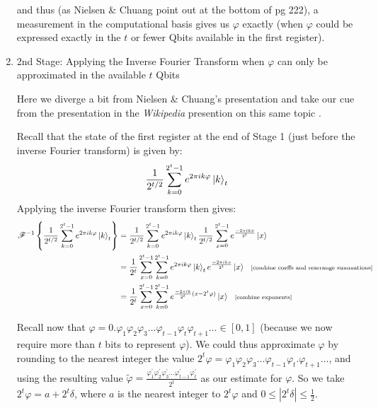 \documentclass{article}
\begin{document}
\begin{enumerate}[label=\textbf{(\arabic*)}]
and thus (as Nielsen \& Chuang point out at the bottom of pg 222), a measurement in the computational basis gives us $\varphi$ exactly (when $\varphi$ could be expressed exactly in the $t$ or fewer Qbits available in the first register).


\item 2nd Stage: Applying the Inverse Fourier Transform when $\varphi$ can only be approximated in the available $t$ Qbits

\vspace{0.1in}

Here we diverge a bit from Nielsen \& Chuang's presentation and take our cue from the presentation in the \textit{Wikipedia} presention on this same topic \cite{wikipedia:qpe}.

Recall that the state of the first register at the end of Stage 1 (just before the inverse Fourier transform) is given by:
\begin{align}
    \frac{1}{2^{t/2}}
      \sum_{k=0}^{2^t-1}
      e^{2\pi i k\varphi}\ket{k}_{t}
\end{align}
Applying the inverse Fourier transform then gives:
\begin{align}
    \mathscr{F}^{-1}\left\{\frac{1}{2^{t/2}}
      \sum_{k=0}^{2^t-1}
      e^{2\pi i k\varphi}\ket{k}_{t}\right\}
      &=
      \frac{1}{2^{t/2}}
      \sum_{k=0}^{2^t-1}
      e^{2\pi i k\varphi}\ket{k}_{t}
      \frac{1}{2^{t/2}}
      \sum_{x=0}^{2^t-1}
      e^{\frac{-2\pi i kx}{2^t}} \ket{x}\\
      &=
      \frac{1}{2^t}
      \sum_{x=0}^{2^t-1}
      \sum_{k=0}^{2^t-1}
      e^{2\pi i k\varphi}\ket{k}_{t}
      e^{\frac{-2\pi i kx}{2^t}} \ket{x} \hspace{0.1in}\text{\scriptsize [combine coeffs and rearrange summations]}\\
      &=
      \frac{1}{2^t}
      \sum_{x=0}^{2^t-1}
      \sum_{k=0}^{2^t-1}
      e^{\frac{-2\pi i k}{2^t}(x-2^{t}\varphi)} \ket{x} \hspace{0.1in}\text{\scriptsize [combine exponents]}
\end{align}

Recall now that $\varphi = 0.\varphi_{1}\varphi_{2}\varphi_{3}\ldots\varphi_{t-1}\varphi_{t}\varphi_{t+1}\ldots \in [0, 1]$ (because we now require more than $t$ bits to represent $\varphi$). We could thus approximate $\varphi$ by rounding to the nearest integer the value $2^t\varphi = \varphi_{1}\varphi_{2}\varphi_{3}\ldots\varphi_{t-1}\varphi_{t}.\varphi_{t+1}\ldots$, and using the resulting value $\tilde{\varphi} = \frac{\varphi_{1}^{\prime}\varphi_{2}^{\prime}\varphi_{3}^{\prime}\ldots\varphi_{t-1}^{\prime}\varphi_{t}^{\prime}}{2^t}$ as our estimate for $\varphi$. So we take $2^t\varphi = a + 2^t\delta$, where $a$ is the nearest integer to $2^t\varphi$ and $0 \le |2^t\delta| \le \frac{1}{2}$.


\end{enumerate}
\end{document}
